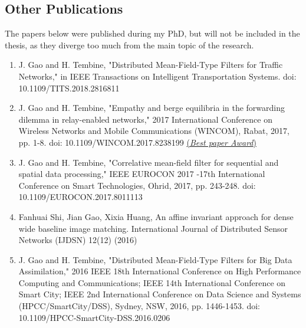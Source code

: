 \documentclass{article}
\begin{document}
\subsection{Other Publications}
The papers below were published during my PhD, but will not be included in the thesis, as they diverge too much from the main topic of the research.
\begin{enumerate}
\item J. Gao and H. Tembine, "Distributed Mean-Field-Type Filters for Traffic Networks," in IEEE Transactions on Intelligent Transportation Systems. doi: 10.1109/TITS.2018.2816811
\item J. Gao and H. Tembine, "Empathy and berge equilibria in the forwarding dilemma in relay-enabled networks," 2017 International Conference on Wireless Networks and Mobile Communications (WINCOM), Rabat, 2017, pp. 1-8. doi: 10.1109/WINCOM.2017.8238199 \href{https://nyuad.nyu.edu/en/news/latest-news/science-and-technology/2017/december/next-generation-cell-phone-networks.html}{(\textit{Best paper Award})}
\item J. Gao and H. Tembine, "Correlative mean-field filter for sequential and spatial data processing," IEEE EUROCON 2017 -17th International Conference on Smart Technologies, Ohrid, 2017, pp. 243-248. doi: 10.1109/EUROCON.2017.8011113
\item Fanhuai Shi, Jian Gao, Xixia Huang, An affine invariant approach for dense wide baseline image matching. International Journal of Distributed Sensor Networks (IJDSN) 12(12) (2016)
\item J. Gao and H. Tembine, "Distributed Mean-Field-Type Filters for Big Data Assimilation," 2016 IEEE 18th International Conference on High Performance Computing and Communications; IEEE 14th International Conference on Smart City; IEEE 2nd International Conference on Data Science and Systems (HPCC/SmartCity/DSS), Sydney, NSW, 2016, pp. 1446-1453. doi: 10.1109/HPCC-SmartCity-DSS.2016.0206
\end{enumerate}





%
\end{document}
